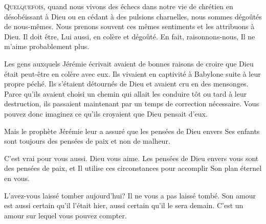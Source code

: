 \dvrule







\lettrine{Q}{uelquefois,} quand nous vivons des échecs
 dans notre vie de chrétien en désobéissant à Dieu ou en cédant
 à des pulsions charnelles, nous sommes dégoûtés de nous-mêmes.
 Nous prenons souvent ces mêmes sentiments et les attribuons à Dieu.
 \Og Il doit être, Lui aussi, en colère et dégoûté.
 En fait, 
 raisonnons-nous, 
 Il ne m'aime probablement plus. \Fg{}


Les gens auxquels Jérémie écrivait avaient de bonnes raisons de croire
 que Dieu était peut-être en colère avec eux. Ils vivaient en captivité
 à Babylone suite à leur propre péché. Ils s'étaient détournés de Dieu
 et avaient cru en des mensonges. Parce qu'ils avaient choisi un chemin
 qui allait les conduire tôt ou tard à leur destruction,
 ils passaient maintenant par un temps de correction nécessaire.
 Vous pouvez donc imaginez ce qu'ils croyaient que Dieu pensait d'eux. 

Mais le prophète Jérémie leur a assuré que les pensées de Dieu envers
 Ses enfants sont toujours des pensées de paix et non de malheur. 

C'est vrai pour vous aussi. Dieu vous aime.
 Les pensées de Dieu envers vous sont des pensées de paix,
 et Il utilise ces circonstances pour accomplir Son plan éternel en vous. 

L'avez-vous laissé tomber aujourd'hui? Il ne vous a pas laissé tombé.
 Son amour est aussi certain qu'il l'était hier,
 aussi certain qu'il le sera demain.
 C'est un amour sur lequel vous pouvez compter. 

